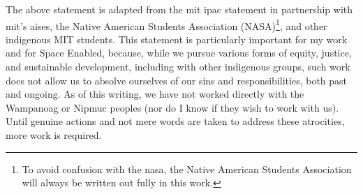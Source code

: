 The above statement is adapted from the \ac{mit} \ac{ipac} statement in partnership with \ac{mit}'s \ac{aises}, the Native American Students Association (NASA)\footnote{To avoid confusion with the \acf{nasa}, the Native American Students Association will always be written out fully in this work.}, and other indigenous MIT students. This statement is particularly important for my work and for Space Enabled, because, while we pursue various forms of equity, justice, and sustainable development, including with other indigenous groups, such work does not allow us to absolve ourselves of our sins and responsibilities, both past and ongoing. As of this writing, we have not worked directly with the Wampanoag or Nipmuc peoples (nor do I know if they wish to work with us). Until genuine actions and not mere words are taken to address these atrocities, more work is required.


